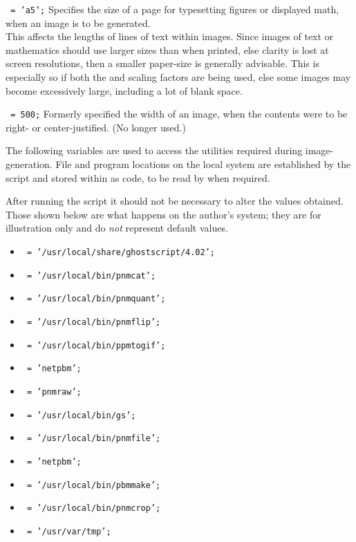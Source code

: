 \begin{htmllist}
\item [\fn{\$PAPERSIZE}\texttt{ = 'a5';}\label{papersize}]
Specifies the size of a page for typesetting figures
or displayed math, when an image is to be generated.\\
This affects the lengths of lines of text within images.
Since images of text or mathematics should use larger sizes than
when printed, else clarity is lost at screen resolutions,
then a smaller paper-size is generally advisable.
This is especially so if both the 
and  scaling factors are being used,
else some images may become excessively large, including a lot
of blank space.


\item [\fn{\$LINE\_WIDTH}\texttt{ = 500;}\label{linewidth}]
Formerly specified the width of an image, when the contents were
to be right- or center-justified. (No longer used.)

\end{htmllist}

\bigskip

\noindent
The following variables are used to access the utilities required during image-generation. 
File and program locations on the local system are established by the  
\Perl{} script and stored within  as \Perl{} code, 
to be read by  when required.

After running the  \Perl{} script it should not be necessary 
to alter the values obtained. Those shown below are what happens on the author's system;
they are for illustration only and do \emph{not} represent default values.
%

\begin{itemize}\label{graphicsutils}%
\item  {}\texttt{ = '/usr/local/share/ghostscript/4.02';}
\item  {}\texttt{ = '/usr/local/bin/pnmcat';}
\item  {}\texttt{ = '/usr/local/bin/pnmquant';}
\item  {}\texttt{ = '/usr/local/bin/pnmflip';}
\item  {}\texttt{ = '/usr/local/bin/ppmtogif';}
\item  {}\texttt{ = 'netpbm';}
\item  {}\texttt{ = 'pnmraw';}
\item  {}\texttt{ = '/usr/local/bin/gs';}
\item  {}\texttt{ = '/usr/local/bin/pnmfile';}
\item  {}\texttt{ = 'netpbm';}
\item  {}\texttt{ = '/usr/local/bin/pbmmake';}
\item  {}\texttt{ = '/usr/local/bin/pnmcrop';}
\item  {}\texttt{ = '/usr/var/tmp';}
\end{itemize}

